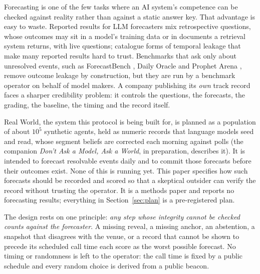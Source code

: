 \documentclass[11pt]{article}
\begin{document}
Forecasting is one of the few tasks where an AI system's competence can be checked against reality rather than against a static answer key. That advantage is easy to waste. Reported results for LLM forecasters mix retrospective questions, whose outcomes may sit in a model's training data or in documents a retrieval system returns, with live questions; \citet{paleka2025pitfalls} catalogue forms of temporal leakage that make many reported results hard to trust. Benchmarks that ask only about unresolved events, such as ForecastBench \citep{karger2024forecastbench}, Daily Oracle \citep{dai2025prescient} and Prophet Arena \citep{yang2025prophet}, remove outcome leakage by construction, but they are run by a benchmark operator on behalf of model makers. A company publishing its \emph{own} track record faces a sharper credibility problem: it controls the questions, the forecasts, the grading, the baseline, the timing and the record itself.

Real World, the system this protocol is being built for, is planned as a population of about $10^5$ synthetic agents, held as numeric records that language models seed and read, whose segment beliefs are corrected each morning against polls (the companion \emph{Don't Ask a Model, Ask a World}, in preparation, describes it). It is intended to forecast resolvable events daily and to commit those forecasts before their outcomes exist. None of this is running yet. This paper specifies how such forecasts should be recorded and scored so that a skeptical outsider can verify the record without trusting the operator. It is a methods paper and reports no forecasting results; everything in Section~\ref{sec:plan} is a pre-registered plan.

The design rests on one principle: \emph{any step whose integrity cannot be checked counts against the forecaster}. A missing reveal, a missing anchor, an abstention, a snapshot that disagrees with the venue, or a record that cannot be shown to precede its scheduled call time each score as the worst possible forecast. No timing or randomness is left to the operator: the call time is fixed by a public schedule and every random choice is derived from a public beacon.
\end{document}
